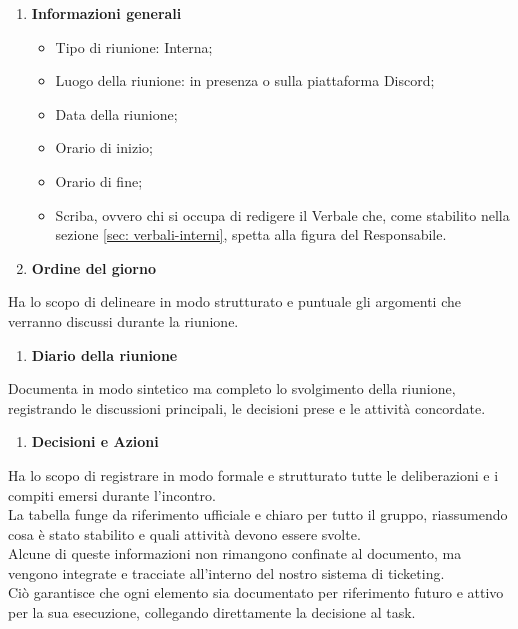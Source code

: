     \begin{enumerate}[label=\arabic*., itemsep=0pt, parsep=1pt, leftmargin=*]
        \item \textbf{Informazioni generali}
        \begin{itemize}[label=--, itemsep=0pt, parsep=1pt, leftmargin=1.5em]
            \item Tipo di riunione: Interna;
            \item Luogo della riunione: in presenza o sulla piattaforma Discord;
            \item Data della riunione;
            \item Orario di inizio; 
            \item Orario di fine;
            \item Scriba, ovvero chi si occupa di redigere il Verbale che, come stabilito nella sezione \ref{sec: verbali-interni}, spetta alla figura del Responsabile.
        \end{itemize}
        \item \textbf{Ordine del giorno} 
    \end{enumerate}

    \vspace{-0.5em}
    Ha lo scopo di delineare in modo strutturato e puntuale gli argomenti che verranno discussi durante la riunione.

    \begin{enumerate}[resume*, itemsep=0pt, parsep=1pt, leftmargin=*, label=\arabic*.]
        \item \textbf{Diario della riunione}
    \end{enumerate}

    \vspace{-0.5em}
    Documenta in modo sintetico ma completo lo svolgimento della riunione, registrando le discussioni principali, le decisioni prese e le attività concordate.

    \begin{enumerate}[resume*, itemsep=0pt, parsep=1pt, leftmargin=*, label=\arabic*.]
        \item \textbf{Decisioni e Azioni}
    \end{enumerate}

    \vspace{-0.5em}
    Ha lo scopo di registrare in modo formale e strutturato tutte le deliberazioni e i compiti emersi durante l'incontro.\\
    La tabella funge da riferimento ufficiale e chiaro per tutto il gruppo, riassumendo cosa è stato stabilito e quali attività devono essere svolte.\\
    Alcune di queste informazioni non rimangono confinate al documento, ma vengono integrate e tracciate all'interno del nostro sistema di ticketing.\\
    Ciò garantisce che ogni elemento sia documentato per riferimento futuro e attivo per la sua esecuzione, collegando direttamente la decisione al task.

